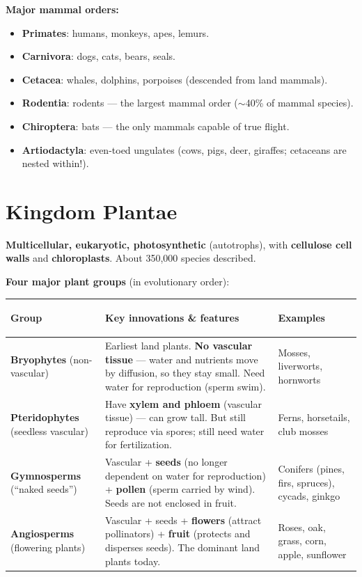 \documentclass[11pt, letterpaper]{article}
\begin{document}
\textbf{Major mammal orders:}
\begin{itemize}[noitemsep]
  \item \textbf{Primates}: humans, monkeys, apes, lemurs.
  \item \textbf{Carnivora}: dogs, cats, bears, seals.
  \item \textbf{Cetacea}: whales, dolphins, porpoises (descended from land mammals).
  \item \textbf{Rodentia}: rodents --- the largest mammal order ($\sim$40\% of mammal species).
  \item \textbf{Chiroptera}: bats --- the only mammals capable of true flight.
  \item \textbf{Artiodactyla}: even-toed ungulates (cows, pigs, deer, giraffes; cetaceans are nested within!).
\end{itemize}

\section*{Kingdom Plantae}

\textbf{Multicellular, eukaryotic, photosynthetic} (autotrophs), with \textbf{cellulose cell walls}
and \textbf{chloroplasts}. About 350{,}000 species described.

\textbf{Four major plant groups} (in evolutionary order):

\noindent
{\renewcommand{\arraystretch}{1.6}
\begin{tabularx}{\textwidth}{>{\bfseries\raggedright\arraybackslash}p{3.5cm}
                              >{\raggedright\arraybackslash}X
                              >{\raggedright\arraybackslash}p{2.8cm}}
\toprule
\rowcolor{tableheaderpurple}
\textbf{Group} & \textbf{Key innovations \& features} & \textbf{Examples} \\
\midrule
\rowcolor{rowPu} \textbf{Bryophytes} (non-vascular) & Earliest land plants. \textbf{No vascular tissue} --- water and nutrients move by diffusion, so they stay small. Need water for reproduction (sperm swim). & Mosses, liverworts, hornworts \\
\rowcolor{rowA}  \textbf{Pteridophytes} (seedless vascular) & Have \textbf{xylem and phloem} (vascular tissue) --- can grow tall. But still reproduce via spores; still need water for fertilization. & Ferns, horsetails, club mosses \\
\rowcolor{rowPu} \textbf{Gymnosperms} (``naked seeds'') & Vascular + \textbf{seeds} (no longer dependent on water for reproduction) + \textbf{pollen} (sperm carried by wind). Seeds are not enclosed in fruit. & Conifers (pines, firs, spruces), cycads, ginkgo \\
\rowcolor{rowA}  \textbf{Angiosperms} (flowering plants) & Vascular + seeds + \textbf{flowers} (attract pollinators) + \textbf{fruit} (protects and disperses seeds). The dominant land plants today. & Roses, oak, grass, corn, apple, sunflower \\
\bottomrule
\end{tabularx}}
\end{document}
